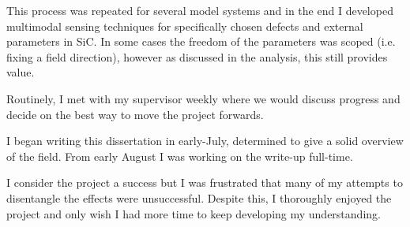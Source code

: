 This process was repeated for several model systems and in the end I developed multimodal sensing techniques for specifically chosen defects and external parameters in SiC. In some cases the freedom of the parameters was scoped (i.e. fixing a field direction), however as discussed in the analysis, this still provides value. 

Routinely, I met with my supervisor weekly where we would discuss progress and decide on the best way to move the project forwards.

I began writing this dissertation in early-July, determined to give a solid overview of the field. From early August I was working on the write-up full-time.

I consider the project a success but I was frustrated that many of my attempts to disentangle the effects were unsuccessful. Despite this, I thoroughly enjoyed the project and only wish I had more time to keep developing my understanding. 

